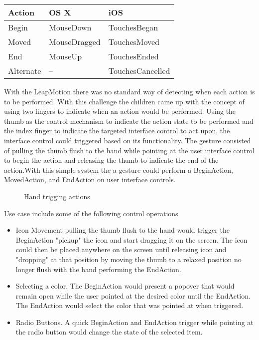 \begin{center}
 \label{tab:title} 
    \begin{tabular}{ | l | l | l |}
    \hline
    Action & OS X & iOS \\ \hline
    Begin  & MouseDown & TouchesBegan \\ \hline
    Moved & MouseDragged & TouchesMoved \\ \hline
    End & MouseUp & TouchesEnded \\ \hline
    Alternate & -- & TouchesCancelled \\ \hline
    \end{tabular}
\end{center}

With the LeapMotion there was no standard way of detecting when each action is to be performed. With this challenge the children came up with the concept of using two fingers to indicate when an action would be performed. Using the thumb as the control mechanism to indicate the action state to be performed and the index finger to indicate the targeted interface control to act upon, the interface control could triggered based on its functionality. The gesture consisted of pulling the thumb flush to the hand while pointing at the user interface control to begin the action and releasing the thumb to indicate the end of the action.With this simple system the a gesture could perform a BeginAction, MovedAction, and EndAction on user interface controls. 


\begin{figure}
\centering     %
{}
\caption{Hand trigging actions}
\end{figure}

Use case include some of the following control operations

\begin{itemize}
\item Icon Movement pulling the thumb flush to the hand would trigger the BeginAction "pickup" the icon and start dragging it on the screen. The icon could then be placed anywhere on the screen until releasing icon and "dropping" at that position by moving the thumb to a relaxed position no longer flush with the hand performing the EndAction.
\item Selecting a color. The BeginAction would present a popover that would remain open while the user pointed at the desired color until the EndAction. The EndAction would select the color that was pointed at when triggered. 
\item Radio Buttons. A quick BeginAction and EndAction trigger while pointing at the radio button would change the state of the selected item. 
\end{itemize}

